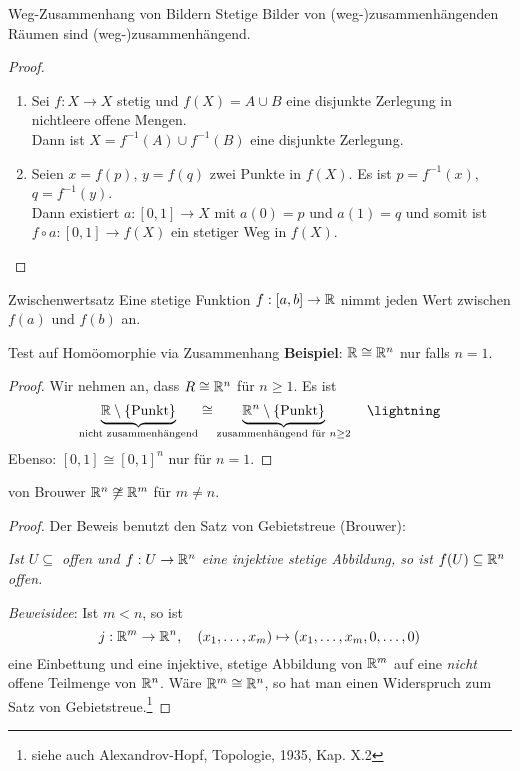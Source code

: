 \begin{lemma}{Weg-Zusammenhang von Bildern}
  Stetige Bilder von (weg-)zusammenhängenden Räumen sind (weg-)zusammenhängend.
  \begin{proof}
    \begin{enumerate}
      \item Sei $ f: X \to X $ stetig und $ f(X) = A \cup B $ eine disjunkte Zerlegung in nichtleere offene Mengen. \\
        Dann ist $ X = f^{-1}(A) \cup f^{-1}(B) $ eine disjunkte Zerlegung.
      \item Seien $ x = f(p) $, $ y = f(q) $ zwei Punkte in $ f(X) $. Es ist $ p = f^{-1}(x) $, $ q = f^{-1}(y) $. \\
        Dann existiert $ a: [0,1] \to X $ mit $ a(0) = p $ und $ a(1) = q $ und somit ist $ f \circ a: [0,1] \to f(X) $ ein stetiger Weg in $ f(X) $. 
    \end{enumerate}
  \end{proof}
\end{lemma}

\begin{corollary}{Zwischenwertsatz}
  Eine stetige Funktion $ f: [a,b] \to \mathbb{R} $ nimmt jeden Wert zwischen $ f(a) $ und $ f(b) $ an.
\end{corollary}

\begin{remark}{Test auf Homöomorphie via Zusammenhang}
  \textbf{Beispiel}: $ \mathbb{R} \cong \mathbb{R}^n $ nur falls $ n = 1 $.
  \begin{proof}
    Wir nehmen an, dass $ R \cong \mathbb{R}^n $ für $ n \geq 1 $. Es ist
    \begin{equation*}
      \underbrace{\R \setminus \{ \text{Punkt} \}}_{\text{nicht zusammenhängend}} \cong \underbrace{\R^n \setminus \{ \text{Punkt} \} }_{\text{zusammenhängend für } n \geq 2} \quad \lightning
    \end{equation*}
    Ebenso: $ [0,1] \cong [0,1]^n $ nur für $ n = 1 $.
  \end{proof}
\end{remark}

\begin{theorem}{von Brouwer}
  $ \mathbb{R}^n \not \cong \mathbb{R}^m $ für $ m \neq n $.
  \begin{proof}
    Der Beweis benutzt den Satz von Gebietstreue (Brouwer):
    \begin{center}
      \emph{Ist $ U \subseteq $ offen und $ f: U \to \mathbb{R}^n $ eine injektive stetige Abbildung, so ist $ f(U) \subseteq \mathbb{R}^n $ offen.}
    \end{center}
    \emph{Beweisidee}: Ist $ m < n $, so ist
    \begin{equation*}
      j: \mathbb{R}^m \to \mathbb{R}^n, \quad (x_1, \dots, x_m) \mapsto (x_1, \dots, x_m, 0, \dots, 0)
    \end{equation*}
    eine Einbettung und eine injektive, stetige Abbildung von $ \mathbb{R}^m $ auf eine \emph{nicht} offene Teilmenge von $ \mathbb{R}^n $. Wäre $ \mathbb{R}^m \cong \mathbb{R}^n $, so hat man einen Widerspruch zum Satz von Gebietstreue.\footnote{siehe auch Alexandrov-Hopf, Topologie, 1935, Kap. X.2}
  \end{proof}
\end{theorem}

